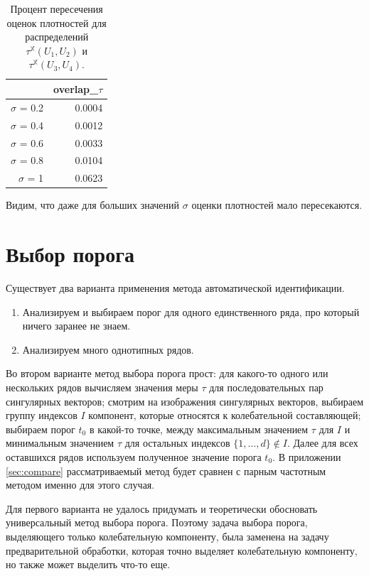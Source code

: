 \documentclass[specialist,
               substylefile = spbu.rtx,
               subf,href,colorlinks=true, 12pt]{disser}
\begin{document}
\begin{table}[hhh!]
\caption{Процент пересечения оценок плотностей для распределений $\tau^{\mathbb{X}}(U_1, U_2)$ и $\tau^{\mathbb{X}}(U_3, U_4)$.}
\centering
\begin{tabular}{rr}
  \hline
 & overlap\_$\tau$ \\
  \hline
$\sigma$ = 0.2 & 0.0004 \\ 
  $\sigma$ = 0.4 & 0.0012 \\ 
  $\sigma$ = 0.6 & 0.0033 \\ 
  $\sigma$ = 0.8 & 0.0104 \\ 
  $\sigma$ = 1 & 0.0623 \\ 
   \hline
\end{tabular}
\label{tab:model_dist_tau1_overlap_sig_noise_notint}
\end{table}

Видим, что даже для больших значений $\sigma$ оценки плотностей мало пересекаются.

\section{Выбор порога}
\label{sec:treshold_selection}

Существует два варианта применения метода автоматической идентификации.

\begin{enumerate}
\item Анализируем и выбираем порог для одного единственного ряда, про который ничего заранее не знаем.
\item Анализируем много однотипных рядов.
\end{enumerate}

Во втором варианте метод выбора порога прост:
для какого-то одного или нескольких рядов вычисляем значения меры $\tau$ для последовательных пар сингулярных векторов;
смотрим на изображения сингулярных векторов, выбираем группу индексов $I$ компонент, которые относятся к колебательной составляющей; выбираем порог $t_0$ в какой-то точке, между максимальным значением $\tau$ для $I$ и минимальным значением $\tau$ для остальных индексов $\{1,\ldots,d\} \not \in I$. Далее для всех оставшихся рядов используем полученное значение порога $t_0$. В приложении \ref{sec:compare} рассматриваемый метод будет сравнен с парным частотным методом именно для этого случая. 

Для первого варианта не удалось придумать и теоретически обосновать универсальный метод выбора порога. Поэтому задача выбора порога, выделяющего только колебательную компоненту, была заменена на задачу предварительной обработки, которая точно выделяет колебательную компоненту, но также может выделить что-то еще.
\end{document}
